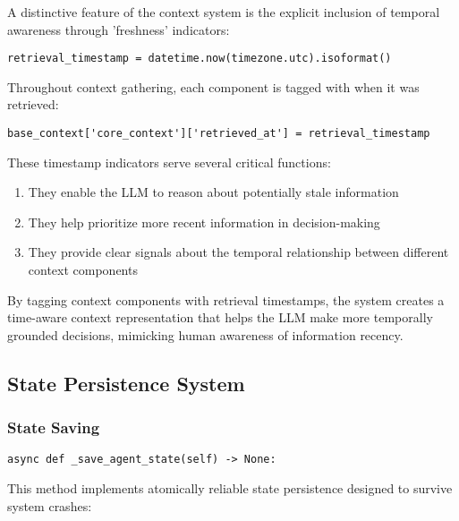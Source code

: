 \documentclass[12pt,a4paper]{article}
\begin{document}
A distinctive feature of the context system is the explicit inclusion of temporal awareness through 'freshness' indicators:
\begin{pageablecode}
\begin{verbatim}
retrieval_timestamp = datetime.now(timezone.utc).isoformat()
\end{verbatim}
\end{pageablecode}
Throughout context gathering, each component is tagged with when it was retrieved:
\begin{pageablecode}
\begin{verbatim}
base_context['core_context']['retrieved_at'] = retrieval_timestamp
\end{verbatim}
\end{pageablecode}
These timestamp indicators serve several critical functions:
\begin{enumerate}[label=\arabic*.]
    \item They enable the LLM to reason about potentially stale information
    \item They help prioritize more recent information in decision-making
    \item They provide clear signals about the temporal relationship between different context components
\end{enumerate}

By tagging context components with retrieval timestamps, the system creates a time-aware context representation that helps the LLM make more temporally grounded decisions, mimicking human awareness of information recency.

\subsection*{State Persistence System}

\subsubsection*{State Saving}
\begin{pageablecode}
\begin{verbatim}
async def _save_agent_state(self) -> None:
\end{verbatim}
\end{pageablecode}
This method implements atomically reliable state persistence designed to survive system crashes:
\end{document}
